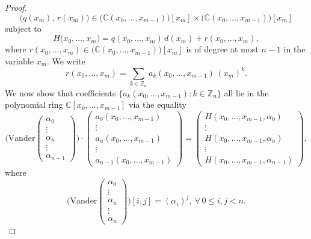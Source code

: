 \begin{proof}
\[
\big(q(x_{m}),\,r(x_{m})\big)\in\big(\mathbb{C}(x_{0},\ldots,x_{m-1})\big)[x_{m}]\times\big(\mathbb{C}(x_{0},\ldots,x_{m-1})\big)[x_{m}]
\]
subject to
\begin{equation}
H\big(x_{0},\ldots,x_{m}\big)=q(x_{0},\ldots,x_{m})\,d(x_{m})+r(x_{0},\ldots,x_{m}),
\end{equation}
where $r\left(x_{0},\ldots,x_{m}\right)\in\big(\mathbb{C}(x_{0},\ldots,x_{m-1})\big)[x_{m}]$
is of degree at most $n-1$ in the variable $x_{m}$. We write 
\begin{equation}
r\left(x_{0},\ldots,x_{m}\right)=\sum_{k\in\mathbb{Z}_{n}}a_{k}\left(x_{0},\ldots,x_{m-1}\right)\,(x_{m})^{k}.
\end{equation}
We now show that coefficients $\big\{ a_k(x_{0},\ldots,x_{m-1}):k\in \mathbb{Z}_n \big\}$ all lie in the polynomial ring $\mathbb{C}[x_{0},\ldots,x_{m-1}]$
via the equality 
\begin{equation}
\bigg(\text{Vander}\left(\begin{array}{c}
\alpha_{0}\\
\vdots\\
\alpha_{u}\\
\vdots\\
\alpha_{n-1}
\end{array}\right)\bigg)\cdot\left(\begin{array}{c}
a_{0}\left(x_{0},\ldots,x_{m-1}\right)\\
\vdots\\
a_{u}\left(x_{0},\ldots,x_{m-1}\right)\\
\vdots\\
a_{n-1}\left(x_{0},\ldots,x_{m-1}\right)
\end{array}\right)=\left(\begin{array}{c}
H(x_{0},\ldots,x_{m-1},\alpha_{0})\\
\vdots\\
H(x_{0},\ldots,x_{m-1},\alpha_{u})\\
\vdots\\
H(x_{0},\ldots,x_{m-1},\alpha_{n-1})
\end{array}\right),
\end{equation}
where 
\begin{equation}
\bigg(\text{Vander}\left(\begin{array}{c}
\alpha_{0}\\
\vdots\\
\alpha_{u}\\
\vdots\\
\alpha_{u}
\end{array}\right)\bigg)\left[i,j\right]=(\alpha_{i})^{j},\ \forall\,0\le i,j<n.

\end{equation}
\end{proof}
